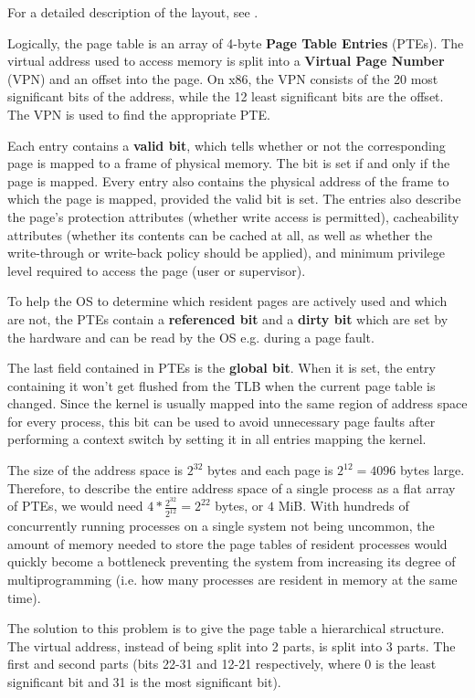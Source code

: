\documentclass[shortabstract, english]{iithesis}
\begin{document}
For a detailed description of the layout, see \cite[Section~4.2]{bib:intel}.

Logically, the page table is an array of 4-byte \textbf{Page Table Entries}
(PTEs). The virtual address used to access memory is split into a
\textbf{Virtual Page Number} (VPN) and an offset into the page. On x86, the VPN
consists of the 20 most significant bits of the address, while the 12 least
significant bits are the offset. The VPN is used to find the appropriate PTE.

Each entry contains a \textbf{valid bit}, which tells whether or not the
corresponding page is mapped to a frame of physical memory. The bit is set if
and only if the page is mapped. Every entry also contains the physical address
of the frame to which the page is mapped, provided the valid bit is set. The
entries also describe the page's protection attributes (whether write access is
permitted), cacheability attributes (whether its contents can be cached at all,
as well as whether the write-through or write-back policy should be applied),
and minimum privilege level required to access the page (user or supervisor).

To help the OS to determine which resident pages are actively used and which are
not, the PTEs contain a \textbf{referenced bit} and a \textbf{dirty bit} which
are set by the hardware and can be read by the OS e.g. during a page fault.

The last field contained in PTEs is the \textbf{global bit}. When it is set, the
entry containing it won't get flushed from the TLB when the current page table
is changed. Since the kernel is usually mapped into the same region of address
space for every process, this bit can be used to avoid unnecessary page faults
after performing a context switch by setting it in all entries mapping the
kernel.

The size of the address space is $2^{32}$ bytes and each page is $2^{12} = 4096$
bytes large. Therefore, to describe the entire address space of a single process
as a flat array of PTEs, we would need $4 * \frac{2^{32}}{2^{12}} = 2^{22}$
bytes, or $4$ MiB. With hundreds of concurrently running processes on a single
system not being uncommon, the amount of memory needed to store the page tables
of resident processes would quickly become a bottleneck preventing the system
from increasing its degree of multiprogramming (i.e. how many processes are
resident in memory at the same time).

The solution to this problem is to give the page table a hierarchical structure.
The virtual address, instead of being split into 2 parts, is split into 3 parts.
The first and second parts (bits 22-31 and 12-21 respectively, where 0 is the
least significant bit and 31 is the most significant bit).
\end{document}
